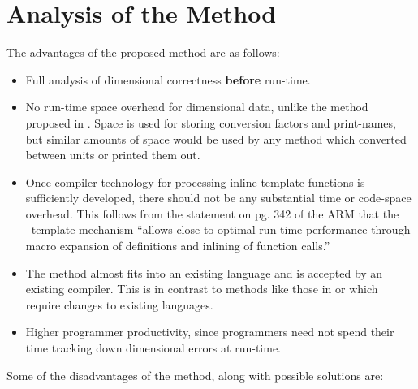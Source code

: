 \section{Analysis of the Method}
The advantages of the proposed method are as follows:
\begin{itemize}
\item Full analysis of dimensional correctness {\bf before} run-time. 

\item No run-time space overhead for dimensional data, unlike the
method proposed in \cite{cmelik:88}.  Space is used for storing
conversion factors and print-names, but similar amounts of space
would be used by any method which converted between units or
printed them out.

\item Once compiler technology for processing inline template
functions is sufficiently developed, there should not be any
substantial time or code-space overhead.  This follows from the
statement on pg. 342 of the ARM that the \cpp\ template mechanism
``allows close to optimal run-time performance through macro
expansion of definitions and inlining of function calls.''

\item The method almost fits into an existing language and is
accepted by an existing compiler.  This is in contrast to methods
like those in \cite{gehani:77} or \cite{house:83} which require
changes to existing languages.

\item Higher programmer productivity, since programmers need not
spend their time tracking down dimensional errors at run-time.

\end{itemize}

Some of the disadvantages of the method, along with possible
solutions are:

